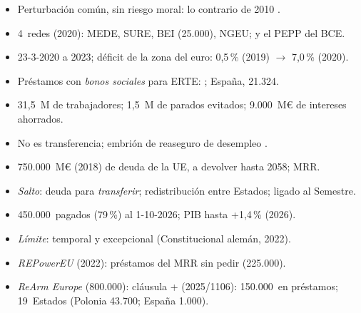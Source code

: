 \documentclass{article}
\begin{document}
\begin{columnas}
\begin{itemize}
\item Perturbación común, sin riesgo moral: lo contrario de 2010 .
\item 4~redes (2020): MEDE, SURE, BEI (25.000), NGEU; y el PEPP del BCE.
\end{itemize}
\begin{itemize}
\item 23-3-2020 a 2023; déficit de la zona del euro: 0,5\,\% (2019) $\to$ 7,0\,\% (2020).
\end{itemize}
\begin{itemize}
\item Préstamos con \emph{bonos sociales} para ERTE: ; España, 21.324.
\item 31,5~M de trabajadores; 1,5~M de parados evitados; 9.000~M€ de intereses ahorrados.
\item No es transferencia; embrión de reaseguro de desempleo .
\end{itemize}
\begin{itemize}
\item 750.000~M€ (2018) de deuda de la UE, a devolver hasta 2058; MRR.
\item \emph{Salto}: deuda para \emph{transferir}; redistribución entre Estados; ligado al Semestre.
\item 450.000~pagados (79\,\%) al 1-10-2026; PIB hasta +1,4\,\% (2026).
\item \emph{Límite}: temporal y excepcional (Constitucional alemán, 2022).
\end{itemize}
\begin{itemize}
\item \emph{REPowerEU} (2022): préstamos del MRR sin pedir (225.000).
\item \emph{ReArm Europe} (800.000): cláusula +  (2025/1106): 150.000~en préstamos; 19~Estados (Polonia 43.700; España 1.000).
\end{itemize}


\end{columnas}
\end{document}
